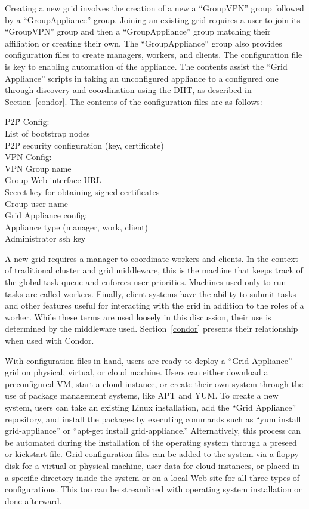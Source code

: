 \documentclass[conference]{IEEEtran}
\begin{document}
Creating a new grid involves the creation of a new a ``GroupVPN'' group
followed by a ``GroupAppliance'' group.  Joining an existing grid requires a
user to join its ``GroupVPN'' group and then a ``GroupAppliance'' group
matching their affiliation or creating their own.  The ``GroupAppliance'' group
also provides configuration files to create managers, workers, and clients.
The configuration file is key to enabling automation of the appliance.  The
contents assist the ``Grid Appliance'' scripts in taking an unconfigured
appliance to a configured one through discovery and coordination using the DHT,
as described in Section~\ref{condor}.  The contents of the configuration files
are as follows:

\begin{tabbing}
P2\=P Config:\\
\> List of bootstrap nodes\\
\> P2P security configuration (key, certificate)\\
VPN Config:\\
\> VPN Group name\\
\> Group Web interface URL\\
\> Secret key for obtaining signed certificates\\
\> Group user name\\
Grid Appliance config:\\
\> Appliance type (manager, work, client)\\
\> Administrator ssh key\\
\end{tabbing}

A new grid requires a manager to coordinate workers and clients.  In the
context of traditional cluster and grid middleware, this is the machine that
keeps track of the global task queue and enforces user priorities.  Machines
used only to run tasks are called workers.  Finally, client systems have the
ability to submit tasks and other features useful for interacting with the grid
in addition to the roles of a worker.  While these terms are used loosely in
this discussion, their use is determined by the middleware used.
Section~\ref{condor} presents their relationship when used with Condor.

With configuration files in hand, users are ready to deploy a ``Grid
Appliance'' grid on physical, virtual, or cloud machine.  Users can either
download a preconfigured VM, start a cloud instance, or create their own system
through the use of package management systems, like APT and YUM.  To create a
new system, users can take an existing Linux installation, add the ``Grid
Appliance'' repository, and install the packages by executing commands such as
``yum install grid-appliance'' or ``apt-get install grid-appliance.''
Alternatively, this process can be automated during the installation of the
operating system through a preseed or kickstart file.  Grid configuration files
can be added to the system via a floppy disk for a virtual or physical machine,
user data for cloud instances, or placed in a specific directory inside the
system or on a local Web site for all three types of configurations.  This too
can be streamlined with operating system installation or done afterward.  
 
\end{document}
